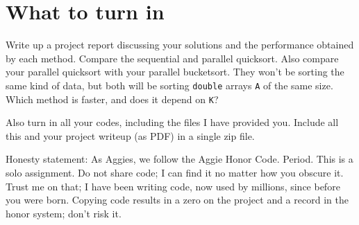 \documentclass[11pt]{article}
\begin{document}
\section{What to turn in}

Write up a project report discussing your solutions and the performance
obtained by each method.  Compare the sequential and parallel quicksort.
Also compare your parallel quicksort with your parallel bucketsort.
They won't be sorting the same kind of data, but both will be sorting
\verb'double' arrays \verb'A' of the same size.  Which method is faster,
and does it depend on \verb'K'?

Also turn in all your codes, including the files I have provided you.
Include all this and your project writeup (as PDF) in a single zip file.

Honesty statement:  As Aggies, we follow the Aggie Honor Code.  Period.  This
is a solo assignment.  Do not share code; I can find it no matter how you
obscure it.  Trust me on that; I have been writing code, now used by millions,
since before you were born.  Copying code results in a zero on the project and
a record in the honor system; don't risk it.
\end{document}
